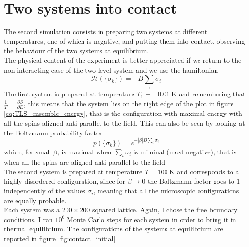 \section{Two systems into contact}
The second simulation consists in preparing two systems at different temperatures, one of which is negative, and putting them into contact, observing the behaviour of the two systems at equilibrium. \\
The physical content of the experiment is better appreciated if we return to the non-interacting case of the two level system and we use the hamiltonian
\begin{equation*}
    \mathcal{H}(\{\sigma_k\}) = -B \sum_i \sigma_i
\end{equation*}
The first system is prepared at temperature $T_1 = \SI{-0.01}{\kelvin}$ and remembering that $\frac{1}{T} = \frac{\partial S}{\partial E}$, this means that the system lies on the right edge of the plot in figure \ref{eq:TLS_ensemble_energy}, that is the configuration with maximal energy with all the spins aligned anti-parallel to the field. This can 
also be seen by looking at the Boltzmann probability factor 
\begin{equation*}
    p(\{\sigma_k\}) = e^{-|\beta| B \sum_i \sigma_i}
\end{equation*}
which, for small $\beta$, is maximal when $\sum_i \sigma_i$ is miminal (most negative), that is when all the spins are aligned anti-parallel to the field. \\
The second system is prepared at temperature $T=\SI{100}{\kelvin}$ and corresponds to a highly disordered configuration, since for $\beta \to 0$ the Boltzmann factor goes to $1$ independently of the values $\sigma_i$, meaning that all the microscopic configurations are equally probable. \\
Each system was a $200 \times 200$ squared lattice. Again, I chose the free boundary conditions. I ran $10^6$ Monte Carlo steps for each system in order to bring it in thermal equilibrium. The configurations of the systems at equilibrium are reported in figure \ref{fig:contact_initial}. \par
